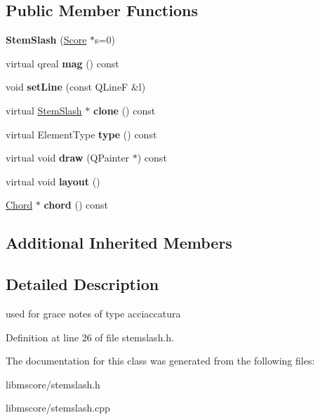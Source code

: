 \subsection*{Public Member Functions}
\begin{DoxyCompactItemize}
\item 
\mbox{\label{class_ms_1_1_stem_slash_abfb1d8570638dc17f1b8564fdd3a2b98}} 
{\bfseries Stem\+Slash} (\hyperlink{class_ms_1_1_score}{Score} $\ast$s=0)
\item 
\mbox{\label{class_ms_1_1_stem_slash_a3980ed495a2cfb54ea04bb1b5abe0a79}} 
virtual qreal {\bfseries mag} () const
\item 
\mbox{\label{class_ms_1_1_stem_slash_adb972943e4a20e1113af641fdf70604f}} 
void {\bfseries set\+Line} (const Q\+LineF \&l)
\item 
\mbox{\label{class_ms_1_1_stem_slash_a9cb50ddf6215babc567723d01d036703}} 
virtual \hyperlink{class_ms_1_1_stem_slash}{Stem\+Slash} $\ast$ {\bfseries clone} () const
\item 
\mbox{\label{class_ms_1_1_stem_slash_a0ea4df414c2d9ef0a76c1f34fd760233}} 
virtual Element\+Type {\bfseries type} () const
\item 
\mbox{\label{class_ms_1_1_stem_slash_a847bdbe49f5d413536e072bfff4be2bc}} 
virtual void {\bfseries draw} (Q\+Painter $\ast$) const
\item 
\mbox{\label{class_ms_1_1_stem_slash_ac0f34cfaad39870d93a107913b98bfe0}} 
virtual void {\bfseries layout} ()
\item 
\mbox{\label{class_ms_1_1_stem_slash_a670459e8733116fbd49b7673cc3bb4eb}} 
\hyperlink{class_ms_1_1_chord}{Chord} $\ast$ {\bfseries chord} () const
\end{DoxyCompactItemize}
\subsection*{Additional Inherited Members}


\subsection{Detailed Description}
used for grace notes of type acciaccatura 

Definition at line 26 of file stemslash.\+h.



The documentation for this class was generated from the following files\+:\begin{DoxyCompactItemize}
\item 
libmscore/stemslash.\+h\item 
libmscore/stemslash.\+cpp\end{DoxyCompactItemize}
